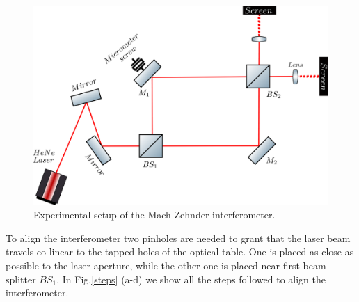 \documentclass[12pt]{book}
\begin{document}
\begin{figure}[t!]
\centering
\includegraphics[scale=0.4]{images/mach_sara.png}
\caption{Experimental setup of the Mach-Zehnder interferometer.}
\label{newnewsingle}
\end{figure}

To align the interferometer two pinholes are needed to grant that the laser beam travels co-linear to the tapped holes of the optical table. One is placed as close as possible to the laser aperture, while the other one is placed near first beam splitter $BS_{1}$. In Fig.\ref{steps} (a-d) we show all the steps followed to align the interferometer.
\end{document}
